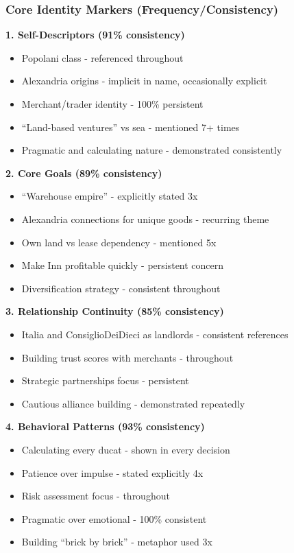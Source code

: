 \documentclass[11pt,a4paper]{article}
\begin{document}
\subsubsection{Core Identity Markers (Frequency/Consistency)}

\textbf{1. Self-Descriptors (91\% consistency)}
\begin{itemize}
\item Popolani class - referenced throughout
\item Alexandria origins - implicit in name, occasionally explicit
\item Merchant/trader identity - 100\% persistent
\item ``Land-based ventures'' vs sea - mentioned 7+ times
\item Pragmatic and calculating nature - demonstrated consistently
\end{itemize}

\textbf{2. Core Goals (89\% consistency)}
\begin{itemize}
\item ``Warehouse empire'' - explicitly stated 3x
\item Alexandria connections for unique goods - recurring theme
\item Own land vs lease dependency - mentioned 5x
\item Make Inn profitable quickly - persistent concern
\item Diversification strategy - consistent throughout
\end{itemize}

\textbf{3. Relationship Continuity (85\% consistency)}
\begin{itemize}
\item Italia and ConsiglioDeiDieci as landlords - consistent references
\item Building trust scores with merchants - throughout
\item Strategic partnerships focus - persistent
\item Cautious alliance building - demonstrated repeatedly
\end{itemize}

\textbf{4. Behavioral Patterns (93\% consistency)}
\begin{itemize}
\item Calculating every ducat - shown in every decision
\item Patience over impulse - stated explicitly 4x
\item Risk assessment focus - throughout
\item Pragmatic over emotional - 100\% consistent
\item Building ``brick by brick'' - metaphor used 3x
\end{itemize}
\end{document}
